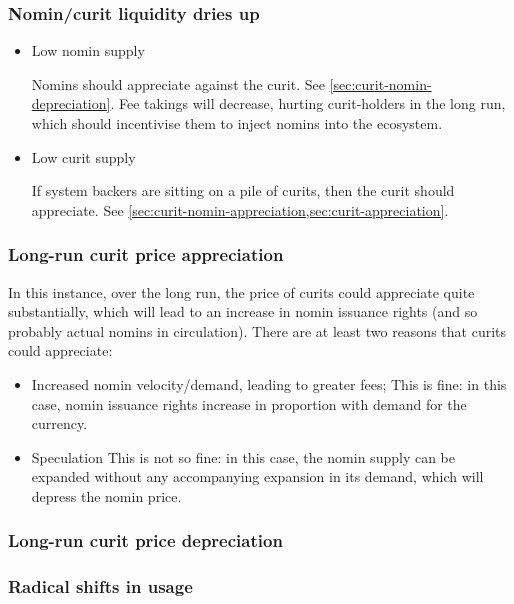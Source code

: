 \subsubsection{Nomin/curit liquidity dries up}
\begin{itemize}
	\item Low nomin supply

	Nomins should appreciate against the curit. See \cref{sec:curit-nomin-depreciation}.
	Fee takings will decrease, hurting curit-holders in the long run,
	which should incentivise them to inject nomins into the ecosystem.

	\item Low curit supply

	If system backers are sitting on a pile of curits, then the curit should
	appreciate. See \cref{sec:curit-nomin-appreciation,sec:curit-appreciation}.
\end{itemize}


\subsubsection{Long-run curit price appreciation}\label{sec:curit-appreciation}
In this instance, over the long run, the price of curits could appreciate quite substantially,
which will lead to an increase in nomin issuance rights (and so probably actual nomins in circulation).
There are at least two reasons that curits could appreciate:
\begin{itemize}
	\item Increased nomin velocity/demand, leading to greater fees;
	This is fine: in this case, nomin issuance rights increase in proportion with demand for the currency.

	\item Speculation
	This is not so fine: in this case, the nomin supply can be expanded without any accompanying
	expansion in its demand, which will depress the nomin price.
\end{itemize}

\subsubsection{Long-run curit price depreciation}\label{sec:curit-depreciation}

\subsubsection{Radical shifts in usage}

